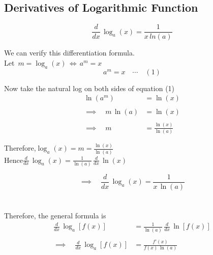 \documentclass[11pt,a4paper]{article}
\theoremstyle{definition}
\begin{document}
\subsection{Derivatives of Logarithmic Function}

$$\boxed{\frac{d}{dx}\, \log_a (x)=\frac{1}{x\, ln (a)}}$$

We can verify this differentiation formula.\\

Let $\,m=\log_a (x)\, \iff\, a^m = x$
$$\boxed{a^m = x\quad \cdots\quad (1)}$$

Now take the natural log on both sides of equation (1)
\begin{align*}
\ln (a^m) & = \ln (x)\\\\
\implies\quad  m\, \ln (a) & = \ln (x)\\\\
\implies \quad  m & = \frac{\ln (x)}{\ln (a)}
\end{align*}



Therefore,\quad  $\displaystyle{\log_a(x)= m = \frac{\ln (x)}{\ln (a)}}$\\

Hence\quad  $\displaystyle{\frac{d}{dx}\, \log_a(x) = \frac{1}{\ln (a)}\,\frac{d}{dx}\, \ln (x)}$

$$\implies\quad \frac{d}{dx}\, \log_a(x) = \frac{1}{x\, \ln (a)}$$\\\\



Therefore, the general formula is
\begin{align*}
\frac{d}{dx}\, \log_a[f(x)] & = \frac{1}{\ln (a)}\, \frac{d}{dx}\, \ln [f(x)]\\\\
\implies\quad \frac{d}{dx}\, \log_a[f(x)] & = \frac{f'(x)}{f(x)\, \ln (a)}\\\\
\end{align*}
\end{document}
